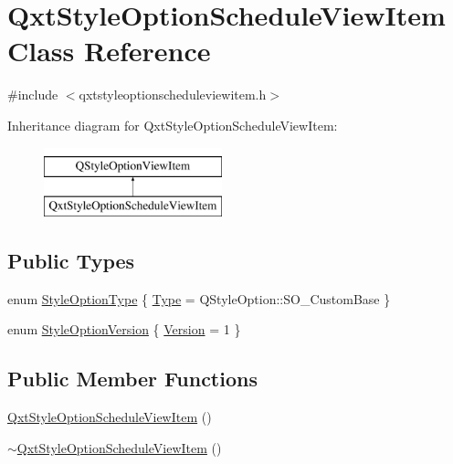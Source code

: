 \hypertarget{class_qxt_style_option_schedule_view_item}{\section{Qxt\-Style\-Option\-Schedule\-View\-Item Class Reference}
\label{class_qxt_style_option_schedule_view_item}
}


{\ttfamily \#include $<$qxtstyleoptionscheduleviewitem.\-h$>$}

Inheritance diagram for Qxt\-Style\-Option\-Schedule\-View\-Item\-:\begin{figure}[H]
\begin{center}
\leavevmode
\includegraphics[height=2.000000cm]{class_qxt_style_option_schedule_view_item}
\end{center}
\end{figure}
\subsection*{Public Types}
\begin{DoxyCompactItemize}
\item 
enum \hyperlink{class_qxt_style_option_schedule_view_item_a303f308dc3d1f796cb9c67294c9c9904}{Style\-Option\-Type} \{ \hyperlink{class_qxt_style_option_schedule_view_item_a303f308dc3d1f796cb9c67294c9c9904a83af58af16b683a02b6e2653cf7af019}{Type} = Q\-Style\-Option\-:\-:S\-O\-\_\-\-Custom\-Base
 \}
\item 
enum \hyperlink{class_qxt_style_option_schedule_view_item_a44ba40f0a6bce1d6d10aae0a3e10fac4}{Style\-Option\-Version} \{ \hyperlink{class_qxt_style_option_schedule_view_item_a44ba40f0a6bce1d6d10aae0a3e10fac4ad53071683282ade9dd477846386c151d}{Version} = 1
 \}
\end{DoxyCompactItemize}
\subsection*{Public Member Functions}
\begin{DoxyCompactItemize}
\item 
\hyperlink{class_qxt_style_option_schedule_view_item_a5528823df075be0ccdbd679c591abdd1}{Qxt\-Style\-Option\-Schedule\-View\-Item} ()
\item 
\hyperlink{class_qxt_style_option_schedule_view_item_abb3e85119d639ae76492e3d7687bd01e}{$\sim$\-Qxt\-Style\-Option\-Schedule\-View\-Item} ()
\end{DoxyCompactItemize}
